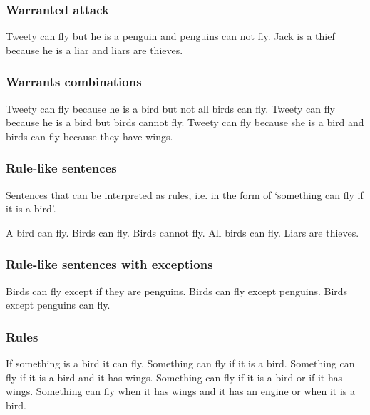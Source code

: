 \subsubsection{Warranted attack}
\begin{exe}
\ex\label{e46} Tweety can fly but he is a penguin and penguins can not fly.
\ex\label{e47} Jack is a thief because he is a liar and liars are thieves.
\end{exe}

\subsubsection{Warrants combinations}
\begin{exe}
\ex\label{e48} Tweety can fly because he is a bird but not all birds can fly.
\ex\label{e49} Tweety can fly because he is a bird but birds cannot fly.
\ex\label{e50} Tweety can fly because she is a bird and birds can fly because they have wings.
\end{exe}

\subsubsection{Rule-like sentences}
Sentences that can be interpreted as rules, i.e. in the form of `something can fly if it is a bird'.
\begin{exe}
\ex\label{e51} A bird can fly.
\ex\label{e52} Birds can fly.
\ex\label{e53} Birds cannot fly.
\ex\label{e54} All birds can fly.
\ex\label{e55} Liars are thieves.
\end{exe}

\subsubsection{Rule-like sentences with exceptions}
\begin{exe}
\ex\label{e56} Birds can fly except if they are penguins.
\ex\label{e57} Birds can fly except penguins.
\ex\label{e58} Birds except penguins can fly.
\end{exe}

\subsubsection{Rules}
\begin{exe}
\ex\label{e72} If something is a bird it can fly.
\ex\label{e73} Something can fly if it is a bird.
\ex\label{e74} Something can fly if it is a bird and it has wings.
\ex\label{e75} Something can fly if it is a bird or if it has wings.
\ex\label{e76} Something can fly when it has wings and it has an engine or when it is a bird.
\end{exe}

